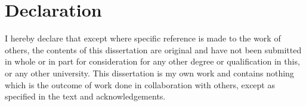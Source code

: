 \chapter*{Declaration}

I hereby declare that except where specific reference is made to the work of others, the contents of this dissertation are original and have not been submitted in whole or in part for consideration for any other degree or qualification in this, or any other university. This dissertation is my own work and contains nothing which is the outcome of work done in collaboration with others, except as specified in the text and acknowledgements. 

